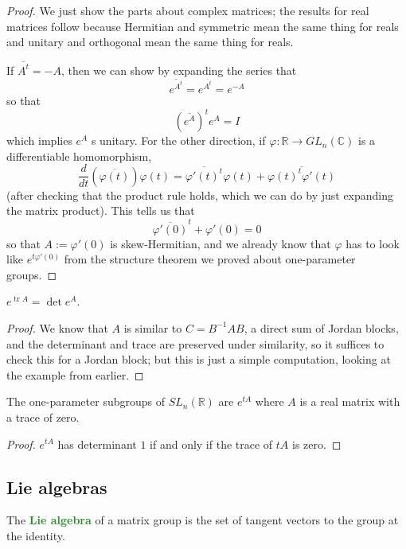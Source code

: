 \documentclass[10pt]{scrartcl}
\providecommand{\ol}{\overline}
\providecommand{\CC}{\mathbb C}
\providecommand{\RR}{\mathbb R}
\providecommand{\opname}{\operatorname}
\providecommand{\inv}{^{-1}}
\providecommand{\vocab}[1]{{\textbf{\textcolor{ForestGreen}{#1}}}}
\begin{document}
\begin{proof}
	We just show the parts about complex matrices; the results for real matrices
	follow because Hermitian and symmetric mean the same thing for reals
	and unitary and orthogonal mean the same thing for reals.
	
	If $\ol{A^t} = -A$, then we can show by expanding the series that
	\[\ol{e^{A^t}} = e^{\ol{A^t}} = e^{-A}\]
	so that
	\[(\ol{e^{A}})^t e^A = I\]
	which implies $e^A$ s unitary. For the other direction,
	if $\varphi\colon\RR\to GL_n(\CC)$ is a differentiable homomorphism,
	\[\frac{d}{dt}(\ol{\varphi(t)})\varphi(t) = \ol{\varphi'(t)^t}\varphi(t)
	+ \ol{\varphi(t)^t\varphi'(t)}\]
	(after checking that the product rule holds, which we can do by
	just expanding the matrix product).
	This tells us that
	\[\ol{\varphi'(0)}^t + \varphi'(0) = 0\]
	so that $A := \varphi'(0)$ is skew-Hermitian, and we already know that
	$\varphi$ has to look like $e^{t\varphi'(0)}$ from
	the structure theorem we proved about one-parameter groups.
\end{proof}

\begin{lemma}
	$e^{\opname{tr}A} = \det e^A$.
\end{lemma}

\begin{proof}
	We know that $A$ is similar to $C = B\inv AB$,
	a direct sum of Jordan blocks, and the determinant
	and trace are preserved under similarity,
	so it suffices to check this for a Jordan block;
	but this is just a simple computation,
	looking at the example from earlier.
\end{proof}

\begin{prop}
	The one-parameter subgroups of $SL_n(\RR)$ are $e^{tA}$
	where $A$ is a real matrix with a trace of zero.
\end{prop}

\begin{proof}
	$e^{tA}$ has determinant $1$ if and only if the trace of $tA$ is zero.
\end{proof}

\subsection{Lie algebras}

\begin{definition}
	The \vocab{Lie algebra} of a matrix group is the set of
	tangent vectors to the group at the identity.
\end{definition}
\end{document}
